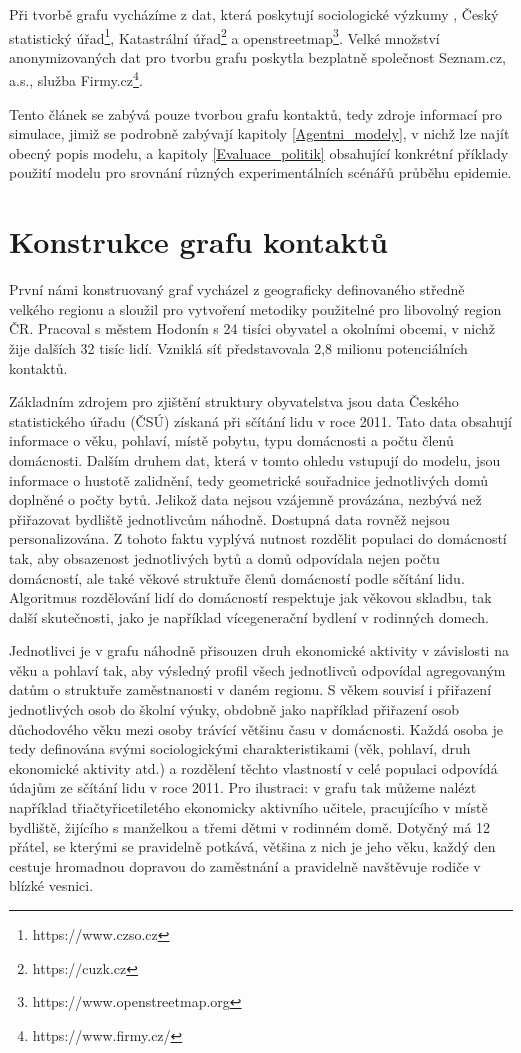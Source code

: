Při tvorbě grafu vycházíme z dat, která poskytují sociologické výzkumy \cite{paqcovid, zaj:mediancovid, zaj:medianlife}, Český statistický úřad\footnote{https://www.czso.cz}, Katastrální úřad\footnote{https://cuzk.cz} a openstreetmap\footnote{https://www.openstreetmap.org}. Velké množství anonymizovaných dat pro tvorbu grafu poskytla bezplatně společnost Seznam.cz, a.s., služba Firmy.cz\footnote{https://www.firmy.cz/}.

Tento článek se zabývá pouze tvorbou grafu kontaktů, tedy zdroje informací pro simulace, jimiž se podrobně zabývají kapitoly \ref{Agentni_modely}, v nichž lze najít obecný popis modelu, a kapitoly \ref{Evaluace_politik} obsahující konkrétní příklady použití modelu pro srovnání různých experimentálních scénářů průběhu epidemie.


\section*{Konstrukce grafu kontaktů}

První námi konstruovaný graf vycházel z geograficky definovaného středně velkého regionu a sloužil pro vytvoření metodiky použitelné pro libovolný region ČR. Pracoval s městem Hodonín s 24 tisíci obyvatel a okolními obcemi, v nichž žije dalších 32 tisíc lidí. Vzniklá síť představovala 2,8 milionu potenciálních kontaktů. 

Základním zdrojem pro zjištění struktury obyvatelstva jsou data Českého statistického úřadu (ČSÚ) získaná při sčítání lidu v roce 2011. Tato data obsahují informace o věku, pohlaví, místě pobytu, typu domácnosti a počtu členů domácnosti. Dalším druhem dat, která v tomto ohledu vstupují do modelu, jsou informace o hustotě zalidnění, tedy geometrické souřadnice jednotlivých domů doplněné o počty bytů. Jelikož data nejsou vzájemně provázána, nezbývá než přiřazovat bydliště jednotlivcům náhodně. Dostupná data rovněž nejsou personalizována. Z tohoto faktu vyplývá nutnost rozdělit populaci do domácností tak, aby obsazenost jednotlivých bytů a domů odpovídala nejen počtu domácností, ale také věkové struktuře členů domácností podle sčítání lidu. Algoritmus rozdělování lidí do domácností respektuje jak věkovou skladbu, tak další skutečnosti, jako je například vícegenerační bydlení v rodinných domech.

Jednotlivci je v grafu náhodně přisouzen druh ekonomické aktivity v závislosti na věku a pohlaví tak, aby výsledný profil všech jednotlivců odpovídal agregovaným datům o struktuře zaměstnanosti v daném regionu. S věkem souvisí i přiřazení jednotlivých osob do školní výuky, obdobně jako například přiřazení osob důchodového věku mezi osoby trávící většinu času v domácnosti. Každá osoba je tedy definována svými sociologickými charakteristikami (věk, pohlaví, druh ekonomické aktivity atd.) a rozdělení těchto vlastností v celé populaci odpovídá údajům ze sčítání lidu v roce 2011. Pro ilustraci: v grafu tak můžeme nalézt například třiačtyřicetiletého ekonomicky aktivního učitele, pracujícího v místě bydliště, žijícího s manželkou a třemi dětmi v rodinném domě. Dotyčný má 12 přátel, se kterými se pravidelně potkává, většina z nich je jeho věku, každý den cestuje hromadnou dopravou do zaměstnání a pravidelně navštěvuje rodiče v blízké vesnici.

